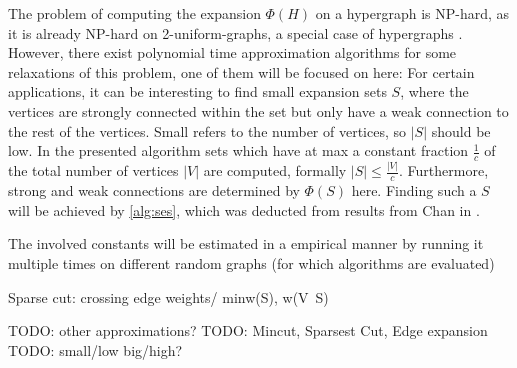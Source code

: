 The problem of computing the expansion $\Phi(H)$ on a hypergraph is NP-hard, as it is already NP-hard on 2-uniform-graphs, a special case of hypergraphs \cite{kaibel2004expansion}.
However, there exist polynomial time approximation algorithms for some relaxations of this problem, one of them will be focused on here:
For certain applications, it can be interesting to find small expansion sets $S$, where the vertices are strongly connected within the set but only have a weak connection to the rest of the vertices. Small refers to the number of vertices, so $|S|$ should be low. In the presented algorithm sets which have at max a constant fraction $\frac{1}{c}$ of the total number of vertices $|V|$ are computed, formally $|S|\le \frac{|V|}{c}$. Furthermore, strong and weak connections are determined by $\Phi(S)$ here. Finding such a $S$ will be achieved by \cref{alg:ses}, which was deducted from results from Chan in \cite{ChanLTZ16}.



The involved constants will be estimated in a empirical manner by running it multiple times on different random graphs (for which algorithms are evaluated)


Sparse cut: crossing edge weights/ min{w(S), w(V\ S)}


TODO: other approximations?
TODO: Mincut, Sparsest Cut, Edge expansion
TODO: small/low big/high?



